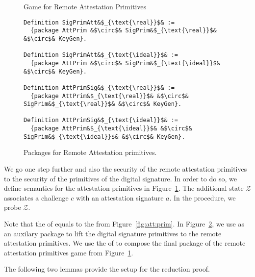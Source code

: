 \begin{figure}
    \centering
    
    \caption{Game for Remote Attestation Primitives}
    \label{fig:att:prim:game}
\end{figure}
\begin{figure}
    \begin{verbatim}
Definition SigPrimAtt&$_{\text{\real}}$& :=
  {package AttPrim &$\circ$& SigPrim&$_{\text{\real}}$& &$\circ$& KeyGen}.

Definition SigPrimAtt&$_{\text{\ideal}}$& :=
  {package AttPrim &$\circ$& SigPrim&$_{\text{\ideal}}$& &$\circ$& KeyGen}.

Definition AttPrimSig&$_{\text{\real}}$& :=
  {package AttPrim&$_{\text{\real}}$& &$\circ$& SigPrim&$_{\text{\real}}$& &$\circ$& KeyGen}.
  
Definition AttPrimSig&$_{\text{\ideal}}$& :=
  {package AttPrim&$_{\text{\ideal}}$& &$\circ$& SigPrim&$_{\text{\ideal}}$& &$\circ$& KeyGen}.
   \end{verbatim}
   \caption{Packages for Remote Attestation primitives.}
   \label{fig:attprims}
\end{figure}


%
We go one step further and also
the security of the remote attestation
primitives to the security of the
primitives of the digital signature.
%
In order to do so, we define semantics
for the attestation primitives in 
Figure~\ref{fig:att:prim:game}.
%
The additional state $\mathcal{Z}$ associates
a challenge $c$ with an attestation signature $a$.
%
In the \everifya procedure, we probe
$\mathcal{Z}$.
%

%
Note that the \real of \pattprim equals to the
\pattprim from Figure~\ref{fig:att:prim}.
%
In Figure~\ref{fig:attprims}, we use
\pattprim as an auxilary package to lift
the digital signature primitives to the
remote attestation primitives.
%
We use the \real of \pattprim to compose the final
package of the remote attestation primitives
game from Figure~\ref{fig:att:prim:game}.
%

%
The following two lemmas provide the
setup for the reduction proof. 
%

